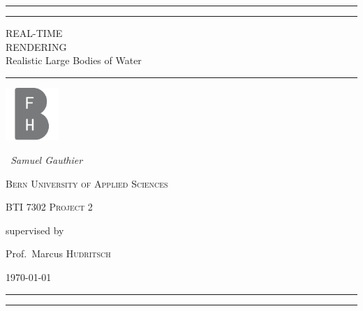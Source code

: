 \begin{titlepage}
	\centering

    \rule{0.9\textwidth}{1pt} 

	\vspace{2pt}\vspace{-\baselineskip}

	\rule{0.9\textwidth}{0.4pt}

	\vspace{0.1\textheight}

    \textcolor[rgb]{0.78,0,0}{
    {\Huge REAL-TIME}\\[0.5\baselineskip]
    {\Huge RENDERING}\\[1.7\baselineskip]
    {\Large Realistic Large Bodies of Water}\\
    }%

    \vspace{0.025\textheight}
    \rule{0.3\textwidth}{0.4pt}

    \vspace{2cm}
    \includegraphics[width=0.15\textwidth]{figures/BFH_Logo_BW.pdf}\par\vspace{1cm}
    \vspace{1cm}
    {\Large{\itshape~Samuel Gauthier\/}\par}{}
    \vspace{0.5cm}
    {\scshape Bern University of Applied Sciences\par}
	{\scshape\Large BTI 7302 Project 2\par}

	\vspace{1cm}
	supervised by\par
	Prof.~Marcus \textsc{Hudritsch}
    \vspace{1cm}
	\vfill

    {\large \today\par}%
    \vfill

    \rule{0.9\textwidth}{0.4pt}

	\vspace{2pt}\vspace{-\baselineskip}

	\rule{0.9\textwidth}{1pt}

\end{titlepage}
\restoregeometry{}

